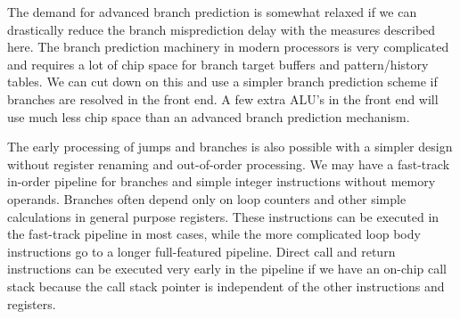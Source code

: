 \documentclass[forwardcom.tex]{subfiles}
\begin{document}
The demand for advanced branch prediction is somewhat relaxed if we can drastically reduce the branch misprediction delay with the measures described here. The branch prediction machinery in modern processors is very complicated and requires a lot of chip space for branch target buffers and pattern/history tables. We can cut down on this and use a simpler branch prediction scheme if branches are resolved in the front end. A few extra ALU's in the front end will use much less chip space than an advanced branch prediction mechanism. 
\vv

The early processing of jumps and branches is also possible with a simpler design without register renaming and out-of-order processing. We may have a fast-track in-order pipeline for branches and simple integer instructions without memory operands. Branches often depend only on loop counters and other simple calculations in general purpose registers. These instructions can be executed in the fast-track pipeline in most cases, while the more complicated loop body instructions go to a longer full-featured pipeline. Direct call and return instructions can be executed very early in the pipeline if we have an on-chip call stack because the call stack pointer is independent of the other instructions and registers.
\vv
\end{document}
